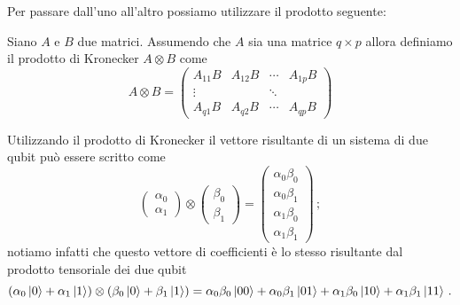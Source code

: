 \noindent Per passare dall'uno all'altro possiamo utilizzare il prodotto seguente:

\begin{definizione}\label{def:Kronecker}
    Siano $A$ e $B$ due matrici. Assumendo che $A$ sia una matrice $q \times p$ allora definiamo il prodotto di Kronecker $A \otimes B$ come
    \begin{equation*}
        A \otimes B =
        \begin{pmatrix}
            A_{11} B & A_{12} B & \cdots & A_{1p} B \\ 
            \vdots & & \ddots & \\
            A_{q1} B & A_{q2} B & \cdots & A_{qp} B
        \end{pmatrix}
    \end{equation*}
\end{definizione}

\begin{esempio}
    Utilizzando il prodotto di Kronecker il vettore risultante di un sistema di due qubit può essere scritto come
    \begin{equation*}
        \begin{pmatrix}
            \alpha_0 \\ \alpha_1
        \end{pmatrix}
        \otimes
        \begin{pmatrix}
            \beta_0 \\ \beta_1
        \end{pmatrix}
        =
        \begin{pmatrix}
            \alpha_0 \beta_0 \\ \alpha_0 \beta_1 \\ \alpha_1 \beta_0 \\ \alpha_1 \beta_1
        \end{pmatrix} \, ;
    \end{equation*}
    notiamo infatti che questo vettore di coefficienti è lo stesso risultante dal prodotto tensoriale dei due qubit
    \begin{equation*}
        (\alpha_0 \ket{0} + \alpha_1 \ket{1}) \otimes (\beta_0 \ket{0} + \beta_1 \ket{1}) = \alpha_0 \beta_0 \ket{00} + \alpha_0 \beta_1 \ket{01} + \alpha_1 \beta_0 \ket{10} + \alpha_1 \beta_1 \ket{11} \, .
    \end{equation*}
\end{esempio}

